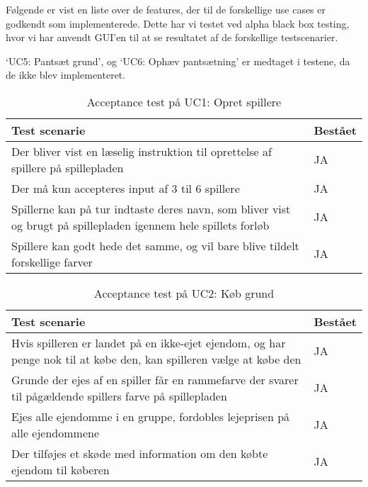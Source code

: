 \documentclass[class=article, crop=false]{standalone}
\begin{document}
    Følgende er vist en liste over de features, der til de forskellige use cases er godkendt som implementerede. Dette har vi testet ved alpha black box testing, hvor vi har anvendt GUI’en til at se resultatet af de forskellige testscenarier. \par
    ‘UC5: Pantsæt grund’, og ‘UC6: Ophæv pantsætning’ er medtaget i testene, da de ikke blev implementeret.

    \begin{table}[H]
        \caption{Acceptance test på UC1: Opret spillere }
        \begin{tabularx}{\textwidth}{|X|l|}
            \hline
            \textbf{Test scenarie}       & \textbf{Bestået}   \\ \hline
            Der bliver vist en læselig instruktion til oprettelse af spillere på spillepladen     & JA \\ \hline
            Der må kun accepteres input af 3 til 6 spillere    & JA \\ \hline
            Spillerne kan på tur indtaste deres navn, som bliver vist og brugt på spillepladen igennem hele spillets forløb     & JA  \\ \hline
            Spillere kan godt hede det samme, og vil bare blive tildelt forskellige farver     & JA \\ \hline
        \end{tabularx}
    \end{table}


    \begin{table}[H]
        \caption{Acceptance test på UC2: Køb grund}
        \begin{tabularx}{\textwidth}{|X|l|}
            \hline
            \textbf{Test scenarie}       & \textbf{Bestået}   \\ \hline
            Hvis spilleren er landet på en ikke-ejet ejendom, og har penge nok til at købe den, kan spilleren vælge at købe den    & JA \\ \hline
            Grunde der ejes af en spiller får en rammefarve der svarer til pågældende spillers farve på spillepladen    & JA \\ \hline
            Ejes alle ejendomme i en gruppe, fordobles lejeprisen på alle ejendommene     & JA  \\ \hline
            Der tilføjes et skøde med information om den købte ejendom til køberen     & JA \\ \hline
        \end{tabularx}
    \end{table}
\end{document}
